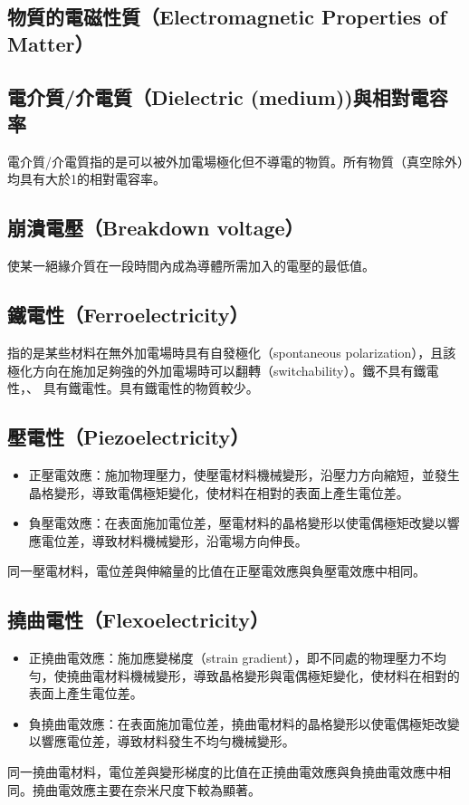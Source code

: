 \documentclass[a4paper,12pt]{report}
\begin{document}
\begin{itemize}
\section{物質的電磁性質（Electromagnetic Properties of Matter）}
\subsection{電介質/介電質（Dielectric (medium))與相對電容率}
電介質/介電質指的是可以被外加電場極化但不導電的物質。所有物質（真空除外）均具有大於1的相對電容率。
\subsection{崩潰電壓（Breakdown voltage）}
使某一絕緣介質在一段時間內成為導體所需加入的電壓的最低值。
\subsection{鐵電性（Ferroelectricity）}
指的是某些材料在無外加電場時具有自發極化（spontaneous polarization），且該極化方向在施加足夠強的外加電場時可以翻轉（switchability）。鐵不具有鐵電性，、 具有鐵電性。具有鐵電性的物質較少。
\subsection{壓電性（Piezoelectricity）}
\begin{itemize}
\item 正壓電效應：施加物理壓力，使壓電材料機械變形，沿壓力方向縮短，並發生晶格變形，導致電偶極矩變化，使材料在相對的表面上產生電位差。
\item 負壓電效應：在表面施加電位差，壓電材料的晶格變形以使電偶極矩改變以響應電位差，導致材料機械變形，沿電場方向伸長。
\end{itemize}
同一壓電材料，電位差與伸縮量的比值在正壓電效應與負壓電效應中相同。
\subsection{撓曲電性（Flexoelectricity）}
\begin{itemize}
\item 正撓曲電效應：施加應變梯度（strain gradient），即不同處的物理壓力不均勻，使撓曲電材料機械變形，導致晶格變形與電偶極矩變化，使材料在相對的表面上產生電位差。
\item 負撓曲電效應：在表面施加電位差，撓曲電材料的晶格變形以使電偶極矩改變以響應電位差，導致材料發生不均勻機械變形。
\end{itemize}
同一撓曲電材料，電位差與變形梯度的比值在正撓曲電效應與負撓曲電效應中相同。撓曲電效應主要在奈米尺度下較為顯著。

\end{itemize}
\end{document}
